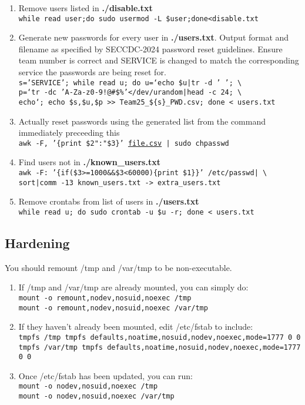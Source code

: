 \documentclass[12pt,letterpaper]{article}
\def\code#1{\textcolor{iris}{\texttt{#1}}}
\def\bf#1{\textbf{#1}}
\def\ul#1{\underline{#1}}
\begin{document}
\begin{enumerate}
	\item Remove users listed in \bf{./disable.txt} \\
		\code{while read user;do sudo usermod -L \$user;done<disable.txt}
	\item Generate new passwords for every user in \bf{./users.txt}. Output format and filename as specified by SECCDC-2024 password reset guidelines. Ensure team number is correct and SERVICE is changed to match the corresponding service the passwords are being reset for. \\
		\code{s='SERVICE'; while read u; do u=`echo \$u|tr -d ' '; \textbackslash\\
		p=`tr -dc 'A-Za-z0-9!@\#\$\%'</dev/urandom|head -c 24; \textbackslash\\
		echo`; echo \$s,\$u,\$p >> Team25\_\$\{s\}\_PWD.csv; done < users.txt}
	\item Actually reset passwords using the generated list from the command immediately preceeding this \\
		\code{awk -F, '\{print \$2":"\$3\}' \ul{file.csv} | sudo chpasswd}
	\item Find users not in \bf{./known\_users.txt} \\
		\code{awk -F: '\{if(\$3>{}=1000\&\&\$3<60000)\{print \$1\}\}' /etc/passwd| \textbackslash \\
		sort|comm -13 known\_users.txt -> extra\_users.txt}
	\item Remove crontabs from list of users in \bf{./users.txt} \\
		\code{while read u; do sudo crontab -u \$u -r; done < users.txt}
\end{enumerate}

\subsection{Hardening}

You should remount /tmp and /var/tmp to be non-executable.
\begin{enumerate}
	\item If /tmp and /var/tmp are already mounted, you can simply do: \code{ \\
		mount -o remount,nodev,nosuid,noexec /tmp \\
		mount -o remount,nodev,nosuid,noexec /var/tmp }
	\item If they haven't already been mounted, edit /etc/fstab to include: \code{ \\
		tmpfs /tmp tmpfs defaults,noatime,nosuid,nodev,noexec,mode=1777 0 0 \\
		tmpfs /var/tmp tmpfs defaults,noatime,nosuid,nodev,noexec,mode=1777 0 0 }
	\item Once /etc/fstab has been updated, you can run: \code{ \\
		mount -o nodev,nosuid,noexec /tmp \\
		mount -o nodev,nosuid,noexec /var/tmp }
\end{enumerate}
\end{document}
